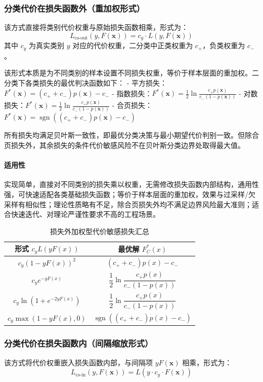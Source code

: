 \documentclass[12pt,a4paper]{article}
\DeclareMathOperator{\sgn}{sgn}
\newcommand{\x}{\boldsymbol{x}}
\begin{document}
\subsubsection{分类代价在损失函数外（重加权形式）}
该方式直接将类别代价权重与原始损失函数相乘，形式为：
$$
L_{\text{cs-out}}(y, F(\x)) = c_y \cdot L(y, F(\x))
$$
其中 $c_y$ 为真实类别 $y$ 对应的代价权重，二分类中正类权重为 $c_+$，负类权重为 $c_-$。

该形式本质是为不同类别的样本设置不同损失权重，等价于样本层面的重加权。二分类下各类损失的最优判决函数如下：
- 平方损失：$F^*(\x) = (c_+ + c_-)p(\x) - c_-$
- 指数损失：$F^*(\x) = \frac{1}{2} \ln \frac{c_+ p(\x)}{c_- (1-p(\x))}$
- 对数损失：$F^*(\x) = \frac{1}{2} \ln \frac{c_+ p(\x)}{c_- (1-p(\x))}$
- 合页损失：$F^*(\x) = \sgn\left( (c_+ + c_-)p(\x) - c_- \right)$

所有损失均满足贝叶斯一致性，即最优分类决策与最小期望代价判别一致。但除合页损失外，其余损失的条件代价敏感风险不在贝叶斯分类边界处取得最大值。

\paragraph{适用性}
实现简单，直接对不同类别的损失乘以权重，无需修改损失函数内部结构，通用性强，可快速适配各类基础损失函数；等价于样本层面的重加权，效果与过采样/欠采样有相似性；理论性质略有不足，除合页损失外均不满足边界风险最大准则；适合快速迭代、对理论严谨性要求不高的工程场景。



\begin{table}[htbp]
  \centering
  \renewcommand{\arraystretch}{2.4}
  \caption{损失外加权型代价敏感损失汇总}
  \label{tab:cs-out-loss}
  \begin{tabular}{cc}
    \toprule
    形式 $c_y L(yF(x))$ & 最优解 $F_C^*(x)$ \\
    \midrule
    $c_y\!\left(1 - yF(x)\right)^2$ & $(c_+ + c_-)p(x) - c_-$ \\
    $c_y e^{-yF(x)}$ & $\dfrac{1}{2}\ln\dfrac{c_+ p(x)}{c_- (1-p(x))}$ \\
    $c_y \ln\!\left(1 + e^{-2yF(x)}\right)$ & $\dfrac{1}{2}\ln\dfrac{c_+ p(x)}{c_- (1-p(x))}$ \\
    $c_y \max\!\left(1 - yF(x), 0\right)$ & $\sgn\!\left((c_+ + c_-)p(x) - c_-\right)$ \\
    \bottomrule
  \end{tabular}
\end{table}

\subsubsection{分类代价在损失函数内（间隔缩放形式）}
该方式将代价权重嵌入损失函数内部，与间隔项 $yF(\x)$ 相乘，形式为：
$$
L_{\text{cs-in}}(y, F(\x)) = L\left( y \cdot c_y \cdot F(\x) \right)
$$
\end{document}
